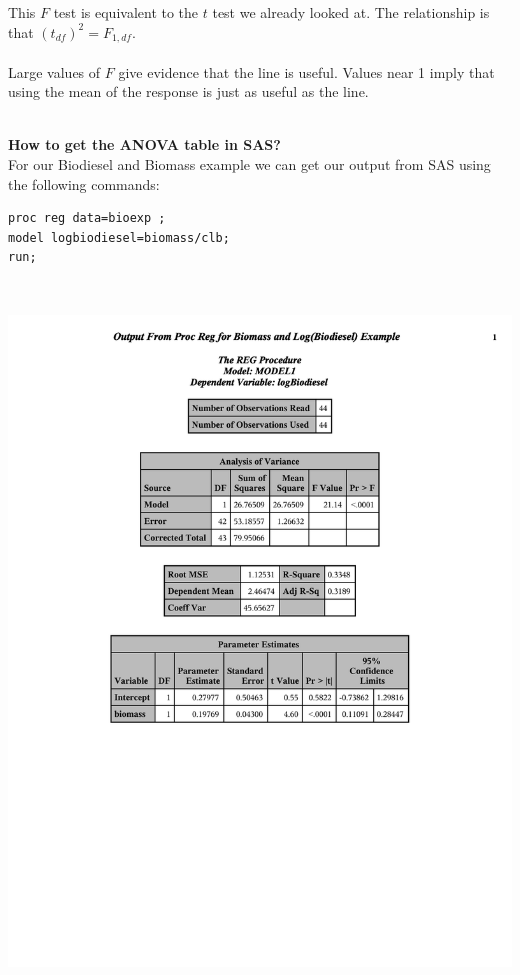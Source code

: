 This $F$ test is equivalent to the $t$ test we already looked at.  The relationship is that $(t_{df})^2=F_{1,df}$.  \\~\\
Large values of $F$ give evidence that the line is useful.  Values near 1 imply that using the mean of the response is just as useful as the line.\\~\\

\newpage

\textbf{How to get the ANOVA table in SAS?}\\
For our Biodiesel and Biomass example we can get our output from SAS using the following commands:
\begin{small}
\begin{verbatim}
proc reg data=bioexp ;
model logbiodiesel=biomass/clb;
run;
\end{verbatim}
\end{small}
~\\
\begin{flushleft}
\includegraphics[scale=0.8,trim= 10mm 105mm 10mm 10mm]{slrbiodiesel}\\
\end{flushleft}
~\\


